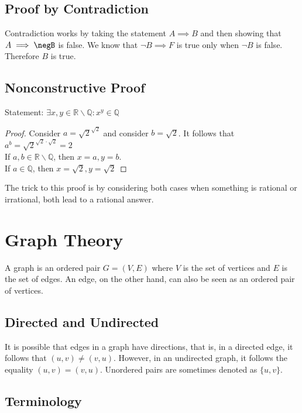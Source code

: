 \documentclass[a4paper]{article}
\theoremstyle{plain}
\theoremstyle{definition}
\newtheorem{exmp}{Example}[section]
\theoremstyle{remark}
\begin{document}
\subsection{Proof by Contradiction}
Contradiction works by taking the statement $A \implies B$ and then showing that $A \implies \negB$ is false. We know that $\neg B \implies F$ is true only when $\neg B$ is false. Therefore $B$ is true.
\subsection{Nonconstructive Proof}
\begin{tcolorbox}[colback=black!3!white,colframe=black!60!white,title=\begin{exmp}Example 1 \label{Example 1}\end{exmp}]
Statement: $\exists x,y \in \mathbb{R}\backslash\mathbb{Q} : x^{y}\in \mathbb{Q}$ 
\begin{proof}	
	Consider $a=\sqrt{2} ^{\sqrt{2} }$ and consider $b=\sqrt{2} $. It follows that $a^{b}=\sqrt{2} ^{\sqrt{2} \cdot\sqrt{2} }=2$ \\
	If $a,b \in \mathbb{R} \backslash \mathbb{Q}$, then $x=a, y=b$.\\
	If $a \in \mathbb{Q}$, then $x=\sqrt{2}, y=\sqrt{2} $
\end{proof}
The trick to this proof is by considering both cases when something is rational or irrational, both lead to a rational answer.
\end{tcolorbox}
\section{Graph Theory}
A graph is an ordered pair $G=(V,E)$ where $V$ is the set of vertices and $E$ is the set of edges. An edge, on the other hand, can also be seen as an ordered pair of vertices.
\subsection{Directed and Undirected}
It is possible that edges in a graph have directions, that is, in a directed edge, it follows that $(u,v) \neq (v,u)$. However, in an undirected graph, it follows the equality $(u,v)=(v,u)$. Unordered pairs are sometimes denoted as  $\{u,v\}$.
\subsection{Terminology}
\end{document}
